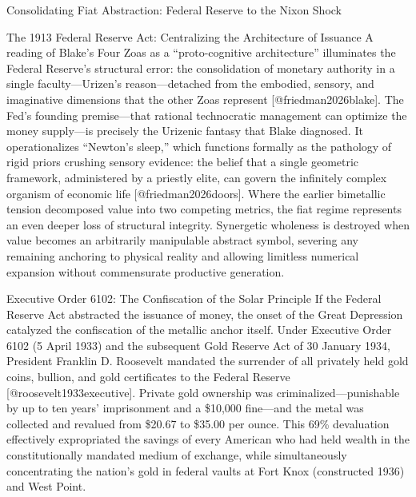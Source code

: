 \documentclass[
  ignorenonframetext,
]{beamer}
\begin{document}
\begin{frame}{Consolidating Fiat Abstraction: Federal Reserve to the
Nixon Shock}
\begin{block}{The 1913 Federal Reserve Act: Centralizing the
Architecture of Issuance}
A reading of Blake's Four Zoas as a ``proto-cognitive architecture''
illuminates the Federal Reserve's structural error: the consolidation of
monetary authority in a single faculty---Urizen's reason---detached from
the embodied, sensory, and imaginative dimensions that the other Zoas
represent {[}@friedman2026blake{]}. The Fed's founding premise---that
rational technocratic management can optimize the money supply---is
precisely the Urizenic fantasy that Blake diagnosed. It operationalizes
``Newton's sleep,'' which functions formally as the pathology of rigid
priors crushing sensory evidence: the belief that a single geometric
framework, administered by a priestly elite, can govern the infinitely
complex organism of economic life {[}@friedman2026doors{]}. Where the
earlier bimetallic tension decomposed value into two competing metrics,
the fiat regime represents an even deeper loss of structural integrity.
Synergetic wholeness is destroyed when value becomes an arbitrarily
manipulable abstract symbol, severing any remaining anchoring to
physical reality and allowing limitless numerical expansion without
commensurate productive generation.
\end{block}

\begin{block}{Executive Order 6102: The Confiscation of the Solar
Principle}
\protect{}\label{executive-order-6102-the-confiscation-of-the-solar-principle}
If the Federal Reserve Act abstracted the issuance of money, the onset
of the Great Depression catalyzed the confiscation of the metallic
anchor itself. Under Executive Order 6102 (5 April 1933) and the
subsequent Gold Reserve Act of 30 January 1934, President Franklin D.
Roosevelt mandated the surrender of all privately held gold coins,
bullion, and gold certificates to the Federal Reserve
{[}@roosevelt1933executive{]}. Private gold ownership was
criminalized---punishable by up to ten years' imprisonment and a
\$10,000 fine---and the metal was collected and revalued from \$20.67 to
\$35.00 per ounce. This 69\% devaluation effectively expropriated the
savings of every American who had held wealth in the constitutionally
mandated medium of exchange, while simultaneously concentrating the
nation's gold in federal vaults at Fort Knox (constructed 1936) and West
Point.


\end{block}
\end{frame}
\end{document}
